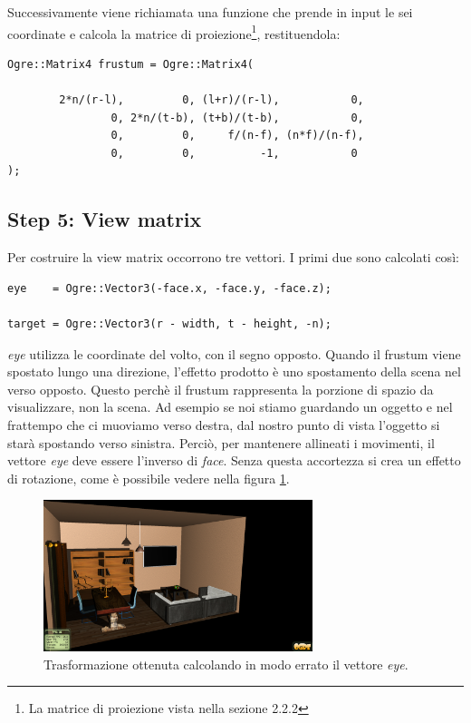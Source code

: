 Successivamente viene richiamata una funzione che prende in input le sei coordinate e calcola la matrice di proiezione\footnote{La matrice di proiezione vista nella sezione 2.2.2}, restituendola:

\begin{lstlisting}
Ogre::Matrix4 frustum = Ogre::Matrix4(
        
        2*n/(r-l),         0, (l+r)/(r-l),           0,
                0, 2*n/(t-b), (t+b)/(t-b),           0,
                0,         0,     f/(n-f), (n*f)/(n-f),
                0,         0,          -1,           0
);

\end{lstlisting}

\subsection*{Step 5: View matrix}
Per costruire la view matrix occorrono tre vettori. I primi due sono calcolati così:
\vspace{1cm}
\begin{lstlisting}
eye    = Ogre::Vector3(-face.x, -face.y, -face.z);

target = Ogre::Vector3(r - width, t - height, -n);
\end{lstlisting}

\textit{eye} utilizza le coordinate del volto, con il segno opposto. Quando il frustum viene spostato lungo una direzione, l'effetto prodotto è uno spostamento della scena nel verso opposto. Questo perchè il frustum rappresenta la porzione di spazio da visualizzare, non la scena. Ad esempio se noi stiamo guardando un oggetto e nel frattempo che ci muoviamo verso destra, dal nostro punto di vista l'oggetto si starà spostando verso sinistra. Perciò, per mantenere allineati i movimenti, il vettore \textit{eye} deve essere l'inverso di \textit{face}.
Senza questa accortezza si crea un effetto di rotazione, come è possibile vedere nella figura \ref{wrong-eye}.

\begin{figure}[htbp]
\centering
\includegraphics[width=0.7\textwidth]{images/progetto/ogre-wrong.png}
\caption{Trasformazione ottenuta calcolando in modo errato il vettore \textit{eye}.\label{wrong-eye}}
\end{figure}


